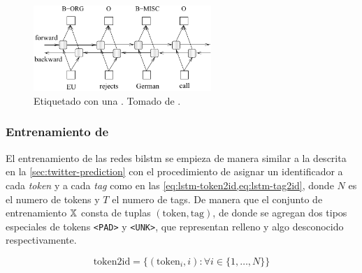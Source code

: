 \begin{figure}[H]
  \centering
  \includegraphics[width=0.6\textwidth]{Figures/bilstm-arch.pdf}
\decoRule
\caption[Etiquetado con una ]{Etiquetado con una . Tomado de \cite{Huang2015}.}
\label{fig:bilstm-arch}
\end{figure}



\subsubsection{Entrenamiento de }
El entrenamiento de las redes \gls{bilstm} se empieza de manera similar a la descrita en la \cref{sec:twitter-prediction} con el procedimiento de asignar un identificador a cada \emph{token} y a cada \emph{tag} como en las \cref{eq:lstm-token2id,eq:lstm-tag2id}, donde $N$ es el numero de tokens y $T$ el numero de tags. De manera que el conjunto de entrenamiento ${\mathbb{X}}$ consta de tuplas $(\text{token}, \text{tag})$, de donde se agregan dos tipos especiales de tokens \texttt{<PAD>} y \texttt{<UNK>}, que representan relleno y algo desconocido respectivamente.

\begin{equation} \label{eq:lstm-token2id}
  \text{token2id} = \Big\{(\text{token}_i, i) : \forall i \in \{1, \ldots, N\} \Big\}
\end{equation}

